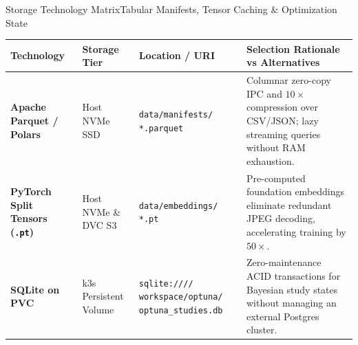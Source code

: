 \begin{frame}{Storage Technology Matrix}{Tabular Manifests, Tensor Caching \& Optimization State}
    \vspace{-0.15cm}
    \begin{center}\scriptsize\renewcommand{\arraystretch}{0.85}
        \begin{tabular}{>{\raggedright\arraybackslash}p{2.3cm} >{\raggedright\arraybackslash}p{2.0cm} >{\raggedright\arraybackslash}p{3.1cm} >{\raggedright\arraybackslash}p{4.2cm}}
            \toprule
            \textbf{Technology} & \textbf{Storage Tier} & \textbf{Location / URI} & \textbf{Selection Rationale vs Alternatives} \\
            \midrule
            \textbf{Apache Parquet / Polars} & Host NVMe SSD & \texttt{data/manifests/} \newline \texttt{*.parquet} & Columnar zero-copy IPC and $10\times$ compression over CSV/JSON; lazy streaming queries without RAM exhaustion. \\
            \midrule
            \textbf{PyTorch Split Tensors (\texttt{.pt})} & Host NVMe \& DVC S3 & \texttt{data/embeddings/} \newline \texttt{*.pt} & Pre-computed foundation embeddings eliminate redundant JPEG decoding, accelerating training by $50\times$. \\
            \midrule
            \textbf{SQLite on PVC} & k3s Persistent Volume & \texttt{sqlite:////} \newline \texttt{workspace/optuna/} \newline \texttt{optuna\_studies.db} & Zero-maintenance ACID transactions for Bayesian study states without managing an external Postgres cluster. \\
            \bottomrule
        \end{tabular}
    \end{center}

\end{frame}

